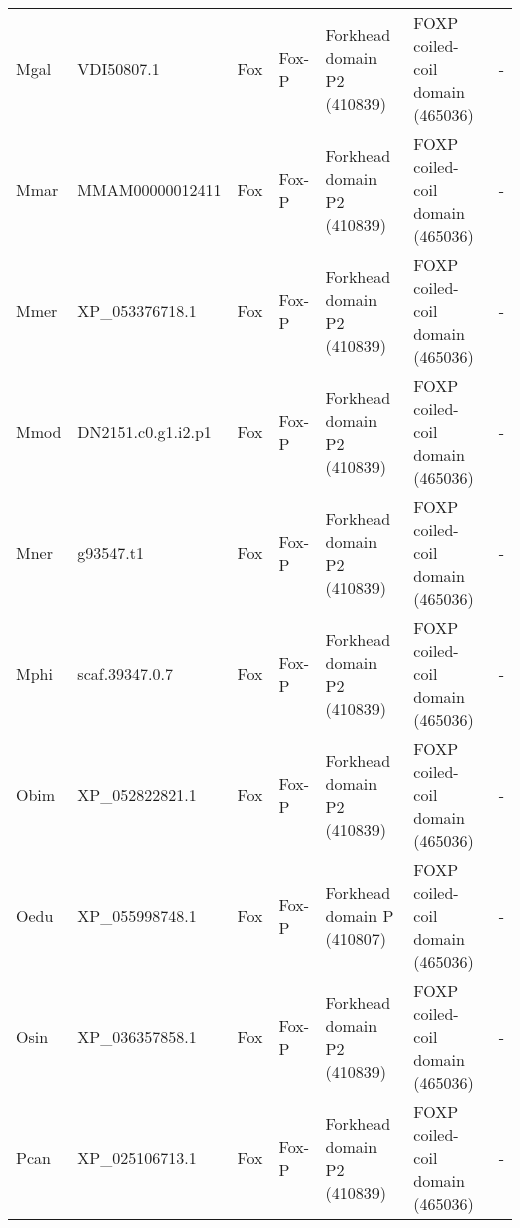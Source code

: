 \documentclass[../main.tex]{subfiles}
\begin{document}
\begin{landscape}
\begin{longtable}{lllllll}
		Mgal           & VDI50807.1            & Fox            & Fox-P               & Forkhead domain P2 (410839)                 & FOXP coiled-coil domain (465036)                                       & -                    \\
		Mmar           & MMAM00000012411       & Fox            & Fox-P               & Forkhead domain P2 (410839)                 & FOXP coiled-coil domain (465036)                                       & -                    \\
		Mmer           & XP\_053376718.1       & Fox            & Fox-P               & Forkhead domain P2 (410839)                 & FOXP coiled-coil domain (465036)                                       & -                    \\
		Mmod           & DN2151.c0.g1.i2.p1    & Fox            & Fox-P               & Forkhead domain P2 (410839)                 & FOXP coiled-coil domain (465036)                                       & -                    \\
		Mner           & g93547.t1             & Fox            & Fox-P               & Forkhead domain P2 (410839)                 & FOXP coiled-coil domain (465036)                                       & -                    \\
		Mphi           & scaf.39347.0.7        & Fox            & Fox-P               & Forkhead domain P2 (410839)                 & FOXP coiled-coil domain (465036)                                       & -                    \\
		Obim           & XP\_052822821.1       & Fox            & Fox-P               & Forkhead domain P2 (410839)                 & FOXP coiled-coil domain (465036)                                       & -                    \\
		Oedu           & XP\_055998748.1       & Fox            & Fox-P               & Forkhead domain P (410807)                  & FOXP coiled-coil domain (465036)                                       & -                    \\
		Osin           & XP\_036357858.1       & Fox            & Fox-P               & Forkhead domain P2 (410839)                 & FOXP coiled-coil domain (465036)                                       & -                    \\
		Pcan           & XP\_025106713.1       & Fox            & Fox-P               & Forkhead domain P2 (410839)                 & FOXP coiled-coil domain (465036)                                       & -                    \\

\end{longtable}
\end{landscape}
\end{document}
